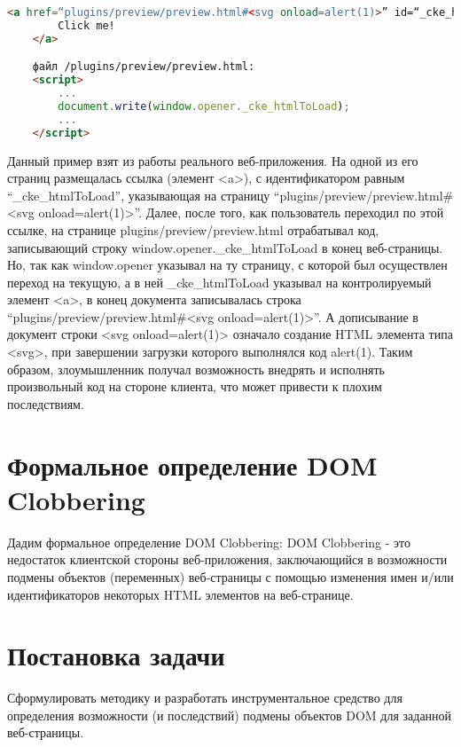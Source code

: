 \begin{lstlisting}[language=HTML]
	<a href=“plugins/preview/preview.html#<svg onload=alert(1)>” id=“_cke_htmlToLoad” target=“_blank”>
		Click me!
	</a>

	файл /plugins/preview/preview.html:
	<script>
		...
		document.write(window.opener._cke_htmlToLoad);
		...
	</script>
\end{lstlisting}
\bigskip


Данный пример взят из работы реального веб-приложения. На одной из его страниц размещалась ссылка (элемент <a>), с идентификатором равным \\
“\_cke\_htmlToLoad”, указывающая на страницу “plugins/preview/preview.html\#<svg onload=alert(1)>”. Далее, после того, как пользователь переходил по этой ссылке, на странице plugins/preview/preview.html отрабатывал код, записывающий строку window.opener.\_cke\_htmlToLoad в конец веб-страницы. Но, так как window.opener указывал на ту страницу, с которой был осуществлен переход на текущую, а в ней \_cke\_htmlToLoad указывал на контролируемый элемент <a>, в конец документа записывалась строка “plugins/preview/preview.html\#<svg onload=alert(1)>”. А дописывание в документ строки <svg onload=alert(1)> означало создание HTML элемента типа <svg>, при завершении загрузки которого выполнялся код alert(1).
Таким образом, злоумышленник получал возможность внедрять и исполнять произвольный код на стороне клиента, что может привести к плохим последствиям.

\section{Формальное определение DOM Clobbering}

Дадим формальное определение DOM Clobbering: DOM Clobbering - это недостаток клиентской стороны веб-приложения, заключающийся в возможности подмены объектов (переменных) веб-страницы с помощью изменения имен и/или идентификаторов некоторых HTML элементов на веб-странице.

\section{Постановка задачи}
Сформулировать методику и разработать инструментальное средство для определения возможности (и последствий) подмены объектов DOM для заданной веб-страницы.